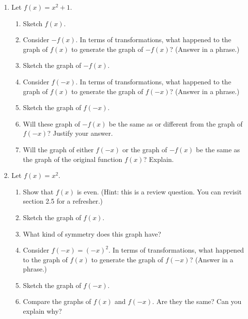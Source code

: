 \documentclass[12pt]{amsart}
\begin{document}
\begin{enumerate}
\item Let $f(x)=x^2+1$.
\begin{enumerate}
\item Sketch $f(x)$.
\item Consider $-f(x)$.  In terms of transformations, what happened to the graph of $f(x)$ to generate the graph of $-f(x)$? (Answer in a phrase.)
\item Sketch the graph of $-f(x)$.
\item Consider $f(-x)$.  In terms of transformations, what happened to the graph of $f(x)$ to generate the graph of $f(-x)$? (Answer in a phrase.)
\item Sketch the graph of $f(-x)$.
\item Will these graph of $-f(x)$ be the same as or different from the graph of $f(-x)$?  Justify your answer.
\item Will the graph of either $f(-x)$ or the graph of $-f(x)$ be the same as the graph of the original function $f(x)$?  Explain.
\end{enumerate}

\item Let $f(x)=x^2$.
\begin{enumerate}
\item Show that $f(x)$ is even.  (Hint: this is a review question.  You can revisit section 2.5 for a refresher.)
\item Sketch the graph of $f(x)$.
\item What kind of symmetry does this graph have?
\item Consider $f(-x)=(-x)^2$.  In terms of transformations, what happened to the graph of $f(x)$ to generate the graph of $f(-x)$? (Answer in a phrase.)
\item Sketch the graph of $f(-x)$.
\item Compare the graphs of $f(x)$ and $f(-x)$.  Are they the same?  Can you explain why?
\end{enumerate}


\end{enumerate}
\end{document}
